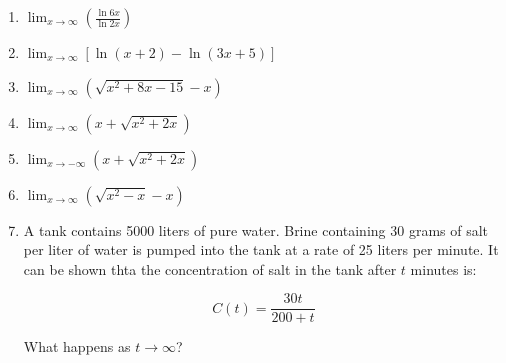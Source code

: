 \documentclass[12pt]{article}
\newif\ifans
\begin{document}
\begin{enumerate}
\ifans{\fbox{$+\infty$}} \fi

\item $\displaystyle \lim_{x\rightarrow \infty}{\left(\frac{\ln{6x}}{\ln{2x}}\right)}$

\ifans{\fbox{1}} \fi

\item $\displaystyle \lim_{x\rightarrow \infty}{\left[\ln{(x+2)}-\ln{(3x+5)}\right]}$

\ifans{\fbox{$\displaystyle \ln{\left(\frac{1}{3}\right)}$}} \fi

\item $\displaystyle \lim_{x \rightarrow \infty}{\left(\sqrt{x^2+8x-15}-x\right)}$

\ifans{\fbox{$4$}} \fi

\item $\displaystyle \lim_{x \rightarrow \infty}{\left(x+\sqrt{x^2+2x}\right)}$

\ifans{\fbox{$+\infty$}} \fi

\item $\displaystyle \lim_{x \rightarrow -\infty}{\left(x+\sqrt{x^2+2x}\right)}$

\ifans{\fbox{$-1$}} \fi

\item  $\displaystyle \lim_{x\rightarrow \infty}{\left(\sqrt{x^2-x}-x\right)}$

\ifans{\fbox{$\displaystyle -\frac{1}{2}$}} \fi

\item A tank contains 5000 liters of pure water.  Brine containing 30 grams of salt per liter of water is pumped into the tank at a rate of 25 liters per minute.  It can be shown thta the concentration of salt in the tank after $t$ minutes is:

$$C(t)=\frac{30t}{200+t}$$

What happens as $t \rightarrow \infty$?

\ifans{\fbox{The concentration of salt approaches $30$ g/L}} \fi

\end{enumerate}

\end{document}
